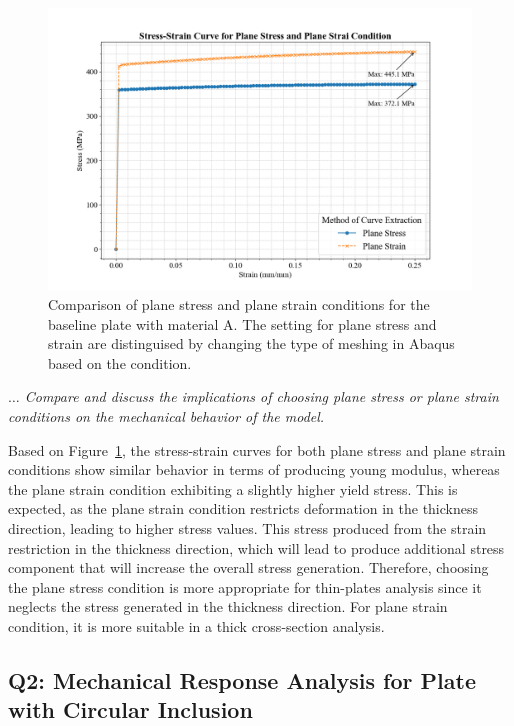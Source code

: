 \documentclass[12pt]{article}
\begin{document}
\begin{figure}[H]
    \centering
    \includegraphics[width=1\textwidth]{visualize_tensileGraph/res/comparison_planeStress_planeStrain.png}
    \caption{Comparison of plane stress and plane strain conditions
    for the baseline plate with material A. The setting for plane stress and strain are distinguised by changing the type of meshing in
    Abaqus based on the condition.} 
    \label{fig:ComparisonDirectCalculated}  
\end{figure}

\textit{$\dots$ Compare and discuss the implications of choosing plane stress or plane strain conditions on
the mechanical behavior of the model.}
\vspace{1em}

\hspace{2em}Based on Figure~\ref{fig:ComparisonDirectCalculated}, the stress-strain curves for both plane stress and plane strain 
conditions show similar behavior in terms of producing young modulus, 
whereas the plane strain condition exhibiting a slightly higher yield stress.
This is expected, as the plane strain condition restricts deformation in the thickness direction, 
leading to higher stress values. This stress produced from the strain restriction in the thickness direction,
which will lead to produce additional stress component that will increase the overall stress generation. Therefore, choosing the 
plane stress condition is more appropriate for thin-plates analysis since it neglects the stress generated 
in the thickness direction. For plane strain condition, it is more suitable in a thick cross-section analysis. 

\newpage
\subsection*{Q2: Mechanical Response Analysis for Plate with Circular Inclusion}
\end{document}
